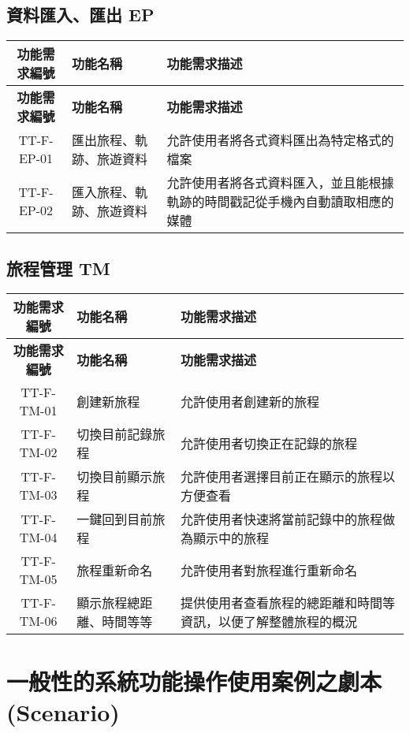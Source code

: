 \documentclass[12pt]{article}
\begin{document}
\subsection{資料匯入、匯出 EP}

\begin{longtable}{|c|p{4.3cm}|p{8.9cm}|}
  \hline
  \textbf{功能需求編號} & \textbf{功能名稱} & \textbf{功能需求描述} \\
  \hline
  \endfirsthead
  \hline
  \textbf{功能需求編號} & \textbf{功能名稱} & \textbf{功能需求描述} \\
  \hline
  \endhead
  TT-F-EP-01 & 匯出旅程、軌跡、旅遊資料 & 允許使用者將各式資料匯出為特定格式的檔案 \\
  \hline
  TT-F-EP-02 & 匯入旅程、軌跡、旅遊資料 & 允許使用者將各式資料匯入，並且能根據軌跡的時間戳記從手機內自動讀取相應的媒體 \\
  \hline
\end{longtable}

\subsection{旅程管理 TM}

\begin{longtable}{|c|p{4.3cm}|p{8.9cm}|}
  \hline
  \textbf{功能需求編號} & \textbf{功能名稱} & \textbf{功能需求描述} \\
  \hline
  \endfirsthead
  \hline
  \textbf{功能需求編號} & \textbf{功能名稱} & \textbf{功能需求描述} \\
  \hline
  \endhead
  TT-F-TM-01 & 創建新旅程 & 允許使用者創建新的旅程 \\
  \hline
  TT-F-TM-02 & 切換目前記錄旅程\footnote[1] & 允許使用者切換正在記錄的旅程 \\
  \hline
  TT-F-TM-03 & 切換目前顯示旅程 & 允許使用者選擇目前正在顯示的旅程以方便查看 \\
  \hline
  TT-F-TM-04 & 一鍵回到目前旅程 & 允許使用者快速將當前記錄中的旅程做為顯示中的旅程 \\
  \hline
  TT-F-TM-05 & 旅程重新命名 & 允許使用者對旅程進行重新命名 \\
  \hline
  TT-F-TM-06 & 顯示旅程總距離、時間等等 & 提供使用者查看旅程的總距離和時間等資訊，以便了解整體旅程的概況 \\
  \hline
\end{longtable}


  
\section{一般性的系統功能操作使用案例之劇本(Scenario)}
\end{document}
